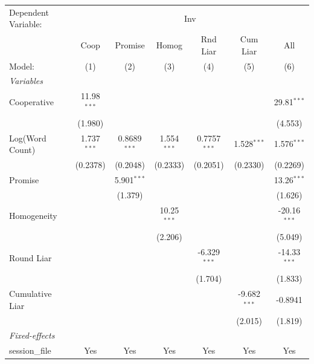 
\begingroup
\centering
\begin{tabular}{lcccccc}
   \tabularnewline \midrule \midrule
   Dependent Variable: & \multicolumn{6}{c}{Inv}\\
                   & Coop          & Promise        & Homog         & Rnd Liar       & Cum Liar       & All \\   
   Model:          & (1)           & (2)            & (3)           & (4)            & (5)            & (6)\\  
   \midrule
   \emph{Variables}\\
   Cooperative     & 11.98$^{***}$ &                &               &                &                & 29.81$^{***}$\\   
                   & (1.980)       &                &               &                &                & (4.553)\\   
   Log(Word Count) & 1.737$^{***}$ & 0.8689$^{***}$ & 1.554$^{***}$ & 0.7757$^{***}$ & 1.528$^{***}$  & 1.576$^{***}$\\   
                   & (0.2378)      & (0.2048)       & (0.2333)      & (0.2051)       & (0.2330)       & (0.2269)\\   
   Promise         &               & 5.901$^{***}$  &               &                &                & 13.26$^{***}$\\   
                   &               & (1.379)        &               &                &                & (1.626)\\   
   Homogeneity     &               &                & 10.25$^{***}$ &                &                & -20.16$^{***}$\\   
                   &               &                & (2.206)       &                &                & (5.049)\\   
   Round Liar      &               &                &               & -6.329$^{***}$ &                & -14.33$^{***}$\\   
                   &               &                &               & (1.704)        &                & (1.833)\\   
   Cumulative Liar &               &                &               &                & -9.682$^{***}$ & -0.8941\\   
                   &               &                &               &                & (2.015)        & (1.819)\\   
   \midrule
   \emph{Fixed-effects}\\
   session\_file   & Yes           & Yes            & Yes           & Yes            & Yes            & Yes\\  

\end{tabular}
